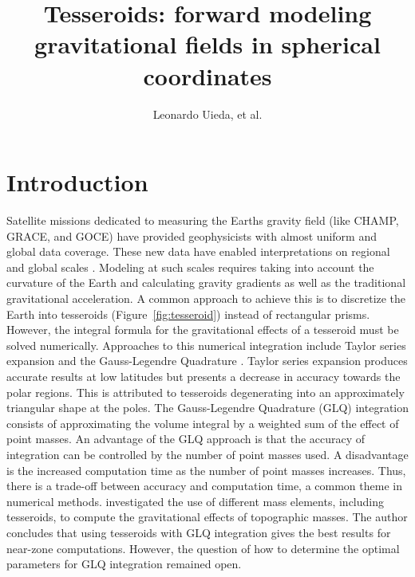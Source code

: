 \documentclass[paper,twocolumn]{geophysics}
\begin{document}
\title{
Tesseroids: forward modeling gravitational fields in spherical coordinates
}

\author{
    Leonardo Uieda\footnotemark[1]\footnotemark[2],
    et al.
}

\address{
    \footnotemark[1]Universidade do Estado do Rio de Janeiro,
    Rio de Janeiro, Brazil.
    email: leouieda@gmail.com
    \footnotemark[2]Observat\'orio Nacional,
    Rio de Janeiro, Brazil.
}

\maketitle


\begin{abstract}
\end{abstract}

\section{Introduction}


Satellite missions dedicated to measuring the Earths gravity field
(like CHAMP, GRACE, and GOCE)
have provided geophysicists with almost uniform and global data coverage.
These new data have enabled interpretations on regional and global scales
\citep[e.g.][]{Reguzzoni2013,Braitenberg2015}.
Modeling at such scales requires taking into account the curvature of the
Earth and calculating gravity gradients as well as the traditional
gravitational acceleration.
A common approach to achieve this is
to discretize the Earth into tesseroids (Figure~\ref{fig:tesseroid})
instead of rectangular prisms.
However, the integral formula for the gravitational effects of a tesseroid
must be solved numerically.
Approaches to this numerical integration include
Taylor series expansion \citep{Heck2007, Grombein2013}
and the Gauss-Legendre Quadrature \citep{Asgharzadeh2007}.
Taylor series expansion produces accurate results at low latitudes but
presents a decrease in accuracy towards the polar regions.
This is attributed to tesseroids degenerating into an approximately triangular
shape at the poles.
The Gauss-Legendre Quadrature (GLQ) integration consists of approximating
the volume integral by a weighted sum of the effect of point masses.
An advantage of the GLQ approach is that the accuracy of integration can be
controlled by the number of point masses used.
A disadvantage is the increased computation time as the number of
point masses increases.
Thus, there is a trade-off between accuracy and computation time, a common
theme in numerical methods.
\citet{Wild-Pfeiffer2008} investigated the use of different mass elements,
including tesseroids, to compute the gravitational effects of topographic
masses.
The author concludes that using tesseroids with GLQ integration gives the best
results for near-zone computations.
However, the question of how to determine the optimal parameters for GLQ
integration remained open.
\end{document}
